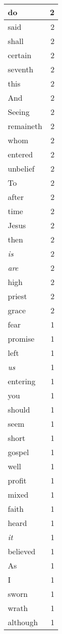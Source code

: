 \begin{center}
\begin{longtable}{l|r}
do & 2\\ \hline 
said & 2\\ \hline 
shall & 2\\ \hline 
certain & 2\\ \hline 
seventh & 2\\ \hline 
this & 2\\ \hline 
And & 2\\ \hline 
Seeing & 2\\ \hline 
remaineth & 2\\ \hline 
whom & 2\\ \hline 
entered & 2\\ \hline 
unbelief & 2\\ \hline 
To & 2\\ \hline 
after & 2\\ \hline 
time & 2\\ \hline 
Jesus & 2\\ \hline 
then & 2\\ \hline 
\emph{is} & 2\\ \hline 
\emph{are} & 2\\ \hline 
high & 2\\ \hline 
priest & 2\\ \hline 
grace & 2\\ \hline 
fear & 1\\ \hline 
promise & 1\\ \hline 
left & 1\\ \hline 
\emph{us} & 1\\ \hline 
entering & 1\\ \hline 
you & 1\\ \hline 
should & 1\\ \hline 
seem & 1\\ \hline 
short & 1\\ \hline 
gospel & 1\\ \hline 
well & 1\\ \hline 
profit & 1\\ \hline 
mixed & 1\\ \hline 
faith & 1\\ \hline 
heard & 1\\ \hline 
\emph{it} & 1\\ \hline 
believed & 1\\ \hline 
As & 1\\ \hline 
I & 1\\ \hline 
sworn & 1\\ \hline 
wrath & 1\\ \hline 
although & 1\\ \hline 

\end{longtable}
\end{center}
